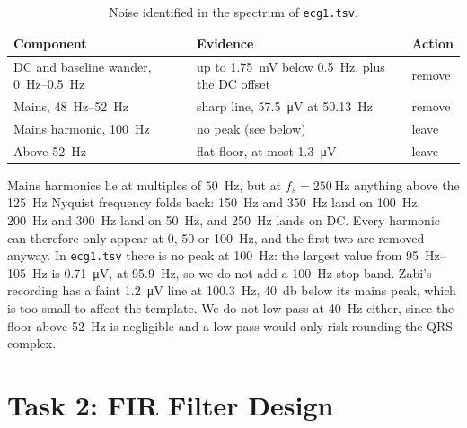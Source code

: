 \documentclass[11pt,a4paper]{article}
\begin{document}
\begin{table}[htbp]
  \centering
  \caption{Noise identified in the spectrum of \texttt{ecg1.tsv}.}
  \label{tab:noise}
  \begin{tabular}{@{}lll@{}}
    \toprule
    Component & Evidence & Action \\
    \midrule
    DC and baseline wander, \SIrange{0}{0.5}{\hertz}
      & up to \SI{1.75}{\milli\volt} below \SI{0.5}{\hertz}, plus the DC offset
      & remove \\
    Mains, \SIrange{48}{52}{\hertz}
      & sharp line, \SI{57.5}{\micro\volt} at \SI{50.13}{\hertz}
      & remove \\
    Mains harmonic, \SI{100}{\hertz}
      & no peak (see below)
      & leave \\
    Above \SI{52}{\hertz}
      & flat floor, at most \SI{1.3}{\micro\volt}
      & leave \\
    \bottomrule
  \end{tabular}
\end{table}

Mains harmonics lie at multiples of \SI{50}{\hertz}, but at
$f_s=\SI{250}{\hertz}$ anything above the \SI{125}{\hertz} Nyquist frequency
folds back: \SI{150}{\hertz} and \SI{350}{\hertz} land on \SI{100}{\hertz},
\SI{200}{\hertz} and \SI{300}{\hertz} land on \SI{50}{\hertz}, and
\SI{250}{\hertz} lands on DC. Every harmonic can therefore only appear at 0, 50
or \SI{100}{\hertz}, and the first two are removed anyway. In
\texttt{ecg1.tsv} there is no peak at \SI{100}{\hertz}: the largest value from
\SIrange{95}{105}{\hertz} is \SI{0.71}{\micro\volt}, at \SI{95.9}{\hertz}, so
we do not add a \SI{100}{\hertz} stop band. Zabi's recording has a faint
\SI{1.2}{\micro\volt} line at \SI{100.3}{\hertz}, \SI{40}{\decibel} below its
mains peak, which is too small to affect the template. We do not low-pass at
\SI{40}{\hertz} either, since the floor above \SI{52}{\hertz} is negligible
and a low-pass would only risk rounding the QRS complex.

\section*{Task 2: FIR Filter Design}
\label{sec:task2}
\end{document}
